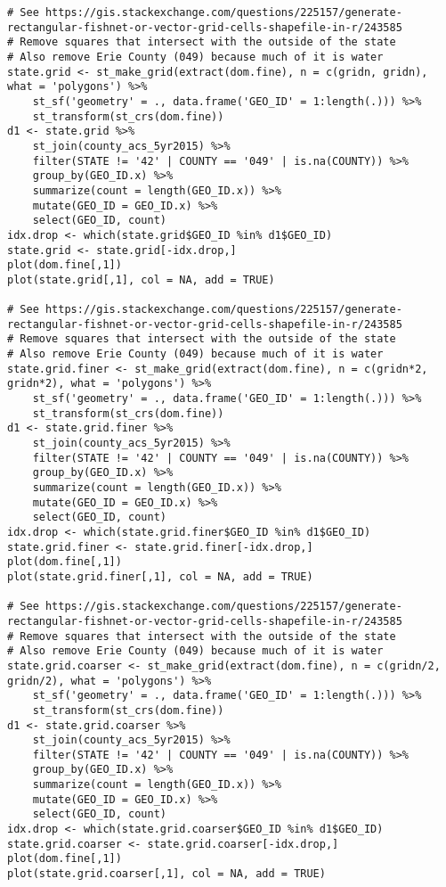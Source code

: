 \documentclass[12pt]{article}
\begin{document}
\begin{scriptsize}
\begin{verbatim}
# See https://gis.stackexchange.com/questions/225157/generate-rectangular-fishnet-or-vector-grid-cells-shapefile-in-r/243585
# Remove squares that intersect with the outside of the state
# Also remove Erie County (049) because much of it is water
state.grid <- st_make_grid(extract(dom.fine), n = c(gridn, gridn), what = 'polygons') %>%
	st_sf('geometry' = ., data.frame('GEO_ID' = 1:length(.))) %>%
	st_transform(st_crs(dom.fine))
d1 <- state.grid %>%
	st_join(county_acs_5yr2015) %>%
	filter(STATE != '42' | COUNTY == '049' | is.na(COUNTY)) %>%
	group_by(GEO_ID.x) %>%
	summarize(count = length(GEO_ID.x)) %>%
	mutate(GEO_ID = GEO_ID.x) %>%
	select(GEO_ID, count)
idx.drop <- which(state.grid$GEO_ID %in% d1$GEO_ID)
state.grid <- state.grid[-idx.drop,]
plot(dom.fine[,1])
plot(state.grid[,1], col = NA, add = TRUE)

# See https://gis.stackexchange.com/questions/225157/generate-rectangular-fishnet-or-vector-grid-cells-shapefile-in-r/243585
# Remove squares that intersect with the outside of the state
# Also remove Erie County (049) because much of it is water
state.grid.finer <- st_make_grid(extract(dom.fine), n = c(gridn*2, gridn*2), what = 'polygons') %>%
	st_sf('geometry' = ., data.frame('GEO_ID' = 1:length(.))) %>%
	st_transform(st_crs(dom.fine))
d1 <- state.grid.finer %>%
	st_join(county_acs_5yr2015) %>%
	filter(STATE != '42' | COUNTY == '049' | is.na(COUNTY)) %>%
	group_by(GEO_ID.x) %>%
	summarize(count = length(GEO_ID.x)) %>%
	mutate(GEO_ID = GEO_ID.x) %>%
	select(GEO_ID, count)
idx.drop <- which(state.grid.finer$GEO_ID %in% d1$GEO_ID)
state.grid.finer <- state.grid.finer[-idx.drop,]
plot(dom.fine[,1])
plot(state.grid.finer[,1], col = NA, add = TRUE)

# See https://gis.stackexchange.com/questions/225157/generate-rectangular-fishnet-or-vector-grid-cells-shapefile-in-r/243585
# Remove squares that intersect with the outside of the state
# Also remove Erie County (049) because much of it is water
state.grid.coarser <- st_make_grid(extract(dom.fine), n = c(gridn/2, gridn/2), what = 'polygons') %>%
	st_sf('geometry' = ., data.frame('GEO_ID' = 1:length(.))) %>%
	st_transform(st_crs(dom.fine))
d1 <- state.grid.coarser %>%
	st_join(county_acs_5yr2015) %>%
	filter(STATE != '42' | COUNTY == '049' | is.na(COUNTY)) %>%
	group_by(GEO_ID.x) %>%
	summarize(count = length(GEO_ID.x)) %>%
	mutate(GEO_ID = GEO_ID.x) %>%
	select(GEO_ID, count)
idx.drop <- which(state.grid.coarser$GEO_ID %in% d1$GEO_ID)
state.grid.coarser <- state.grid.coarser[-idx.drop,]
plot(dom.fine[,1])
plot(state.grid.coarser[,1], col = NA, add = TRUE)


\end{verbatim}
\end{scriptsize}
\end{document}
